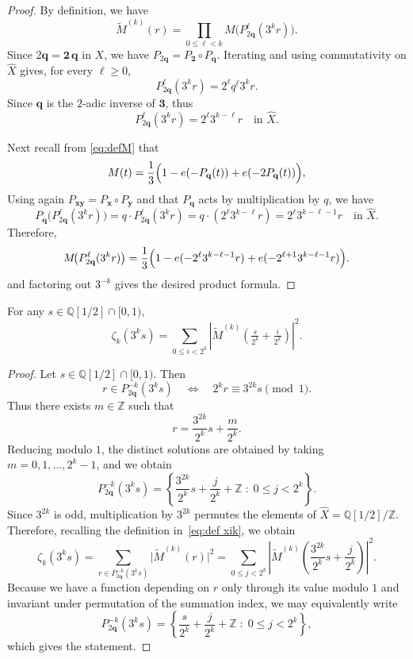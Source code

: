\documentclass[12pt,reqno]{article}
\begin{document}
\begin{proof} By definition, we have 
\[
\widetilde M^{(k)}(r)=\prod_{0\le \ell<k} M\!\bigl(P_{2\mathbf{q}}^\ell(3^k r)\bigr).
\]
Since $2\mathbf{q}=\mathbf{2}\,\mathbf{q}$ in $X$, we have
\(
P_{2\mathbf{q}}=P_{\mathbf{2}}\circ P_{\mathbf{q}} 
\).
Iterating and using commutativity on $\widehat X$ gives, for every $\ell\ge 0$, 
\[
P_{2\mathbf{q}}^\ell(3^k r)=2^\ell q^\ell 3^k r.
\]
Since $\mathbf{q}$ is the $2$-adic inverse of $\mathbf{3}$, thus 
\[
P_{2\mathbf{q}}^\ell(3^k r)=2^\ell 3^{k-\ell} r \quad \text{in }\widehat X.
\]

Next recall from \eqref{eq:defM} that 
\[
M(t)=\frac13\Bigl(1-e(-P_{\mathbf{q}}(t))+e(-2P_{\mathbf{q}}(t))\Bigr),
\]
Using again $P_{\mathbf{x}\mathbf{y}}=P_ \mathbf{x}\circ P_\mathbf{y}$ and that $P_{\mathbf{q}}$ acts by multiplication by $q$,
we have
\[
P_{\mathbf{q}}\bigl(P_{2\mathbf{q}}^\ell(3^k r)\bigr)
=
q\cdot P_{2\mathbf{q}}^\ell(3^k r)
=
q\cdot (2^\ell 3^{k-\ell} r)
=
2^\ell 3^{k-\ell-1} r
\quad \text{in }\widehat X.
\]
Therefore,
\begin{equation}\label{eq:M-on-iterate}
M\!\bigl(P_{2\mathbf{q}}^\ell(3^k r)\bigr)
=
\frac13\Bigl(
1-e(-2^\ell 3^{k-\ell-1}r)+e(-2^{\ell+1}3^{k-\ell-1}r)
\Bigr).
\end{equation}
and factoring out
$3^{-k}$ gives the desired product formula.
\end{proof}
  

\begin{lemma}
For any $s \in \mathbb{Q}[1/2] \cap [0,1)$, 
\[  \zeta_k(3^ks) = 
    \sum_{0 \le i < 2^k}
    |\widetilde{M}^{(k)}(\tfrac{s}{2^k} + \tfrac{i}{2^k})|^2.
  \]
\end{lemma}
\begin{proof}
Let $s \in \mathbb Q[1/2] \cap [0,1)$. Then
\[
r \in P_{2\mathbf{q}}^{-k}(3^k s)
\quad\Longleftrightarrow\quad
2^k r \equiv 3^{2k} s \pmod{1}.
\]
Thus there exists $m \in \mathbb Z$ such that
\[
r = \frac{3^{2k}}{2^k} s + \frac{m}{2^k}.
\]
Reducing modulo $1$, the distinct solutions are obtained by taking
$m = 0,1,\dots,2^k-1$, and we obtain
\[
P_{2\mathbf{q}}^{-k}(3^k s)
=
\left\{
\frac{3^{2k}}{2^k} s + \frac{j}{2^k} + \mathbb Z
\;:\;
0 \le j < 2^k
\right\}.
\]
Since $3^{2k}$ is odd, multiplication by $3^{2k}$ permutes the elements of
$\widehat X = \mathbb Q[1/2]/\mathbb Z$. Therefore, recalling the definition in~\cref{eq:def xik},  we obtain
\[
\zeta_k(3^k s)
=
\sum_{r \in P_{2\mathbf{q}}^{-k}(3^k s)} \bigl| \widetilde M^{(k)}(r) \bigr|^2
=
\sum_{0 \le j < 2^k}
\left|
\widetilde M^{(k)}\!\left( \frac{3^{2k}}{2^k} s + \frac{j}{2^k} \right)
\right|^2.
\]
Because we have a function depending
on $r$ only through its value modulo $1$ and invariant under permutation of the
summation index, we may equivalently write
\[
P_{2\mathbf{q}}^{-k}(3^k s)
=
\left\{
\frac{s}{2^k} + \frac{j}{2^k} + \mathbb Z
\;:\;
0 \le j < 2^k
\right\},
\]
which gives the statement.
\end{proof}
  
\end{document}
